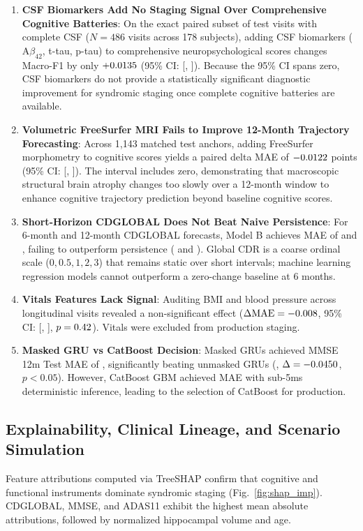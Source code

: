 \documentclass[11pt,a4paper]{article}
\begin{document}
\begin{enumerate}
    \item \textbf{CSF Biomarkers Add No Staging Signal Over Comprehensive Cognitive Batteries}: On the exact paired subset of test visits with complete CSF ($N=486$ visits across 178 subjects), adding CSF biomarkers ($\text{A}\beta_{42}$, t-tau, p-tau) to comprehensive neuropsychological scores changes Macro-F1 by only $+0.0135{}$ (95\% CI: [\StagerDeltaCSFCILo{}, \StagerDeltaCSFCIHi{}]). Because the 95\% CI spans zero, CSF biomarkers do not provide a statistically significant diagnostic improvement for syndromic staging once complete cognitive batteries are available.
    \item \textbf{Volumetric FreeSurfer MRI Fails to Improve 12-Month Trajectory Forecasting}: Across 1,143 matched test anchors, adding FreeSurfer morphometry to cognitive scores yields a paired delta MAE of $-0.0122{}$ points (95\% CI: [\ProgDeltaMRICILo{}, \ProgDeltaMRICIHi{}]). The interval includes zero, demonstrating that macroscopic structural brain atrophy changes too slowly over a 12-month window to enhance cognitive trajectory prediction beyond baseline cognitive scores.
    \item \textbf{Short-Horizon CDGLOBAL Does Not Beat Naive Persistence}: For 6-month and 12-month CDGLOBAL forecasts, Model B achieves MAE of \CDGLOBALMAEVI{} and \CDGLOBALMAEXII{}, failing to outperform persistence (\CDGLOBALPersistVI{} and \CDGLOBALPersistXII{}). Global CDR is a coarse ordinal scale ($0, 0.5, 1, 2, 3$) that remains static over short intervals; machine learning regression models cannot outperform a zero-change baseline at 6 months.
    \item \textbf{Vitals Features Lack Signal}: Auditing BMI and blood pressure across longitudinal visits revealed a non-significant effect ($\Delta\text{MAE} = -0.008{}$, 95\% CI: [\VitalsCILo{}, \VitalsCIHi{}], $p=0.42{}$). Vitals were excluded from production staging.
    \item \textbf{Masked GRU vs CatBoost Decision}: Masked GRUs achieved MMSE 12m Test MAE of \GRUMaskedMAE{}, significantly beating unmasked GRUs (\GRUUnmaskedMAE{}, $\Delta = -0.0450{}$, $p<0.05$). However, CatBoost GBM achieved \GBMProgressionMAE{} MAE with sub-5ms deterministic inference, leading to the selection of CatBoost for production.
\end{enumerate}

\subsection{Explainability, Clinical Lineage, and Scenario Simulation}
Feature attributions computed via TreeSHAP confirm that cognitive and functional instruments dominate syndromic staging (Fig.~\ref{fig:shap_imp}). CDGLOBAL, MMSE, and ADAS11 exhibit the highest mean absolute attributions, followed by normalized hippocampal volume and age.
\end{document}
